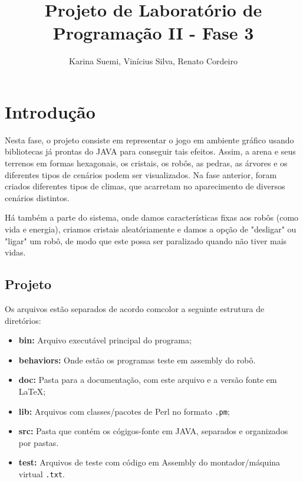 \documentclass[a4paper]{article}
\title  {Projeto de Laboratório de Programação II - Fase 3}
\author {Karina Suemi, Vinícius Silva, Renato Cordeiro}
\date   {}
\begin{document}
\maketitle

\section{Introdução} \label{sec:introdução}

    Nesta fase, o projeto consiste em representar o jogo em ambiente
    gráfico usando bibliotecas já prontas do JAVA para conseguir 
    tais efeitos. 
    Assim, a arena e seus terrenos em formas hexagonais, os cristais, 
    os robôs, as pedras, as árvores e os diferentes tipos de cenários
    podem ser visualizados. Na fase anterior, foram criados diferentes
    tipos de climas, que acarretam no aparecimento de diversos cenários
    distintos.
    
    Há também a parte do sistema, onde damos características fixas aos 
    robôs (como vida e energia), criamos cristais aleatóriamente e 
    damos a opção de "desligar" ou "ligar" um robô, de modo que este 
    possa ser paralizado quando não tiver mais vidas.
    
    
    \subsection{Projeto}
    
    Os arquivos estão separados de acordo comcolor a seguinte estrutura de
    diretórios:
    \begin{itemize}
        \item \textbf{bin:}       Arquivo executável principal do programa;
        \item \textbf{behaviors:} Onde estão os programas teste em assembly
        						  do robô.
        \item \textbf{doc:}       Pasta para a documentação, com este arquivo 
                                  e a versão fonte em \LaTeX;
        \item \textbf{lib:}       Arquivos com classes/pacotes de Perl 
                                  no formato \texttt{.pm};
        \item \textbf{src:}       Pasta que contém os cógigos-fonte em JAVA,
        					      separados e organizados por pastas.
        \item \textbf{test:}      Arquivos de teste com código em Assembly
                                  do montador/máquina virtual \texttt{.txt}.
    \end{itemize}
    
\end{document}
